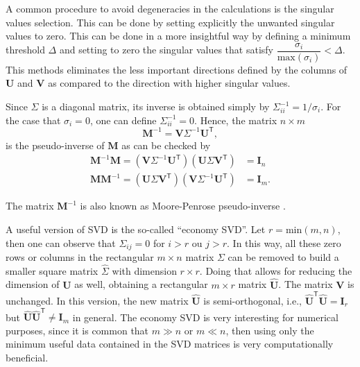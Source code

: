 A common procedure to avoid degeneracies in the calculations is the singular values selection. This can be done by setting explicitly the unwanted singular values to zero. This can be done in a more insightful way by defining a minimum threshold $\Delta$ and setting to zero the singular values that satisfy $\dfrac{\sigma_i}{\mathrm{max}\left(\sigma_i\right)} < \Delta$. This methods eliminates the less important directions defined by the columns of $\mathbf{U}$ and $\mathbf{V}$ as compared to the direction with higher singular values. 

Since $\Sigma$ is a diagonal matrix, its inverse is obtained simply by $\Sigma^{-1}_{ii} = 1/\sigma_{i}$. For the case that $\sigma_{i} = 0$, one can define $\Sigma^{-1}_{ii} = 0$. Hence, the matrix $n \times m$
\begin{equation}
    \mathbf{M}^{-1} = \mathbf{V} \Sigma^{-1} \mathbf{U}^{\mathsf{T}},
    \label{eq:svd_inverse}
\end{equation}
is the pseudo-inverse of $\mathbf{M}$ as can be checked by
\begin{align}
    \mathbf{M}^{-1}\mathbf{M} =  \left(\mathbf{V} \Sigma^{-1} \mathbf{U}^{\mathsf{T}} \right)\left(\mathbf{U} \Sigma \mathbf{V}^{\mathsf{T}}\right) &= \mathbf{I}_{n} \\
    \mathbf{M}\mathbf{M}^{-1} =  \left(\mathbf{U} \Sigma \mathbf{V}^{\mathsf{T}}\right)\left( \mathbf{V} \Sigma^{-1} \mathbf{U}^{\mathsf{T}} \right)&= \mathbf{I}_{m}. 
\end{align}

The matrix $\mathbf{M}^{-1}$ is also known as Moore-Penrose pseudo-inverse \cite{numerical_recipes}.

A useful version of SVD is the so-called ``economy SVD''. Let $r = \mathrm{min}\left(m, n\right)$, then one can observe that $\Sigma_{ij} = 0$ for $i > r$ ou $j > r$. In this way, all these zero rows or columns in the rectangular $m \times n$ matrix $\Sigma$ can be removed to build a smaller square matrix $\hat{\Sigma}$ with dimension $r \times r$. Doing that allows for reducing the dimension of $\mathbf{U}$ as well, obtaining a rectangular $m \times r$ matrix $\hat{\mathbf{U}}$. The matrix $\mathbf{V}$ is unchanged. In this version, the new matrix $\hat{\mathbf{U}}$ is semi-orthogonal, i.e., $\hat{\mathbf{U}}^{\mathsf{T}}\hat{\mathbf{U}} = \mathbf{I}_r$ but $\hat{\mathbf{U}}\hat{\mathbf{U}}^{\mathsf{T}} \neq \mathbf{I}_m$ in general. The economy SVD is very interesting for numerical purposes, since it is common that $m \gg n$ or $m \ll n$, then using only the minimum useful data contained in the SVD matrices is very computationally beneficial.

